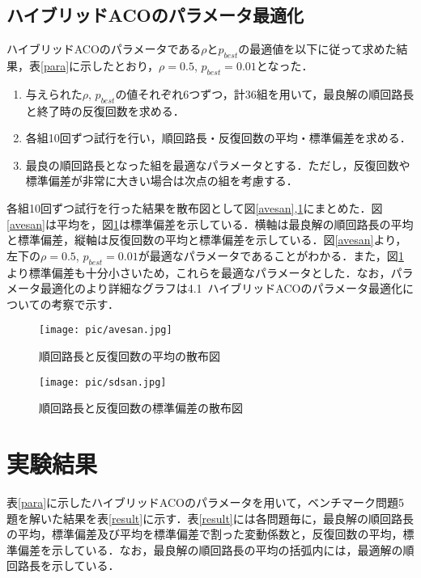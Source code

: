 \documentclass[a4j]{jsarticle}
\begin{document}
\subsection{ハイブリッドACOのパラメータ最適化}
ハイブリッドACOのパラメータである$\rho$と$p_{best}$の最適値を以下に従って求めた結果，表\ref{para}に示したとおり，$\rho = 0.5$, $p_{best} = 0.01$となった．
\begin{enumerate}
 \item 与えられた$\rho$, $p_{best}$の値それぞれ6つずつ，計36組を用いて，最良解の順回路長と終了時の反復回数を求める．
 \item 各組10回ずつ試行を行い，順回路長・反復回数の平均・標準偏差を求める． 
 \item 最良の順回路長となった組を最適なパラメータとする．ただし，反復回数や標準偏差が非常に大きい場合は次点の組を考慮する．
\end{enumerate}

各組10回ずつ試行を行った結果を散布図として図\ref{avesan},\ref{sdsan}にまとめた．図\ref{avesan}は平均を，図\ref{sdsan}は標準偏差を示している．横軸は最良解の順回路長の平均と標準偏差，縦軸は反復回数の平均と標準偏差を示している．図\ref{avesan}より，左下の$\rho = 0.5$, $p_{best} = 0.01$が最適なパラメータであることがわかる．また，図\ref{sdsan}より標準偏差も十分小さいため，これらを最適なパラメータとした．なお，パラメータ最適化のより詳細なグラフは4.1\ ハイブリッドACOのパラメータ最適化についての考察で示す．

\begin{figure}[H]
 \begin{minipage}{0.5\hsize}
  \begin{center}
   \texttt{[image: pic/avesan.jpg]}
  \end{center}
  \caption{順回路長と反復回数の平均の散布図}
  \label{avesan}
 \end{minipage}
 \begin{minipage}{0.5\hsize}
  \begin{center}
   \texttt{[image: pic/sdsan.jpg]}
  \end{center}
  \caption{順回路長と反復回数の標準偏差の散布図}
  \label{sdsan}
 \end{minipage}
\end{figure}


\section{実験結果}
表\ref{para}に示したハイブリッドACOのパラメータを用いて，ベンチマーク問題5題を解いた結果を表\ref{result}に示す．表\ref{result}には各問題毎に，最良解の順回路長の平均，標準偏差及び平均を標準偏差で割った変動係数と，反復回数の平均，標準偏差を示している．なお，最良解の順回路長の平均の括弧内には，最適解の順回路長を示している．
\end{document}
